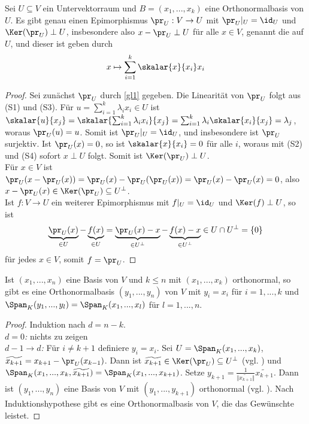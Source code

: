 \begin{proposition}
	Sei $U\subseteq V$ ein Untervektorraum und $B=(x_1,...,x_k)$ eine Orthonormalbasis von $U$. Es gibt genau einen Epimorphismus $\pr_U:V\to U$ mit $\pr_U\vert_U=\id_U$ und $\Ker(\pr_U)\perp U$, insbesondere also $x-\pr_U\perp U$ für alle $x\in V$, genannt die  auf $U$, und dieser ist geben durch
	\begin{align}
		\label{gl1}
		x\mapsto\sum_{i=1}^k \skalar{x}{x_i}x_i
	\end{align}
\end{proposition}
\begin{proof}
	Sei zunächst $\pr_U$ durch \cref{gl1} gegeben. Die Linearität von $\pr_U$ folgt aus (S1) und (S3). Für $u=\sum_{i=1}^k \lambda_i x_i\in U$ ist $\skalar{u}{x_j}=\skalar{\sum_{i=1}^k \lambda_i x_i}{x_j}=\sum_{i=1}^k \lambda_i\skalar{x_i}{x_j}=\lambda_j$, woraus $\pr_U(u)=u$. Somit ist $\pr_U\vert_U=\id_U$, und insbesondere ist $\pr_U$ surjektiv. Ist $\pr_U(x)=0$, so ist $\skalar{x}{x_i}=0$ für alle $i$, woraus mit (S2) und (S4) sofort $x\perp U$ folgt. Somit ist $\Ker(\pr_U)\perp U$. \\
	Für $x\in V$ ist $\pr_U(x-\pr_U(x))=\pr_U(x)-\pr_U(\pr_U(x))=\pr_U(x)-\pr_U(x)=0$, also $x-\pr_U(x)\in\Ker(\pr_U)\subseteq U^\perp$. \\
	Ist $f:V\to U$ ein weiterer Epimorphismus mit $f\vert_U=\id_U$ und $\Ker(f)\perp U$, so ist 
	\begin{align}
		\underbrace{\pr_U(x)}_{\in U}-\underbrace{f(x)}_{\in U}=\underbrace{\pr_U(x)-x}_{\in U^\perp}-\underbrace{f(x)-x}_{\in U^\perp}\in U\cap U^\perp =\{0\}\notag
	\end{align}
	für jedes $x\in V$, somit $f=\pr_U$.
\end{proof}

\begin{theorem}
	Ist $(x_1,...,x_n)$ eine Basis von $V$ und $k\le n$ mit $(x_1,...,x_k)$ orthonormal, so gibt es eine Orthonormalbasis $(y_1,...,y_n)$ von $V$ mit $y_i=x_i$ für $i=1,...,k$ und $\Span_K(y_1,...,y_l)=\Span_K(x_1,...,x_l)$ für $l=1,...,n$.
\end{theorem}
\begin{proof}
	Induktion nach $d=n-k$. \\
	\emph{$d=0$:} nichts zu zeigen \\
	\emph{$d-1\to d$:} Für $i\neq k+1$ definiere $y_i=x_i$. Sei $U=\Span_K(x_1,...,x_k)$, $\widetilde{x_{k+1}}=x_{k+1}-\pr_U(x_{k-1})$. Dann ist $\widetilde{x_{k+1}}\in\Ker(\pr_U)\subseteq U^\perp$ (vgl. ) und $\Span_K(x_1,...,x_k,\widetilde{x_{k+1}})=\Span_K(x_1,...,x_{k+1})$. Setze $y_{k+1}=\frac{1}{\Vert \widetilde{x_{k+1}}\Vert}\widetilde{x_{k+1}}$. Dann ist $(y_1,...,y_n)$ eine Basis von $V$ mit $(y_1,...,y_{k+1})$ orthonormal (vgl. ). Nach Induktionshypothese gibt es eine Orthonormalbasis von $V$, die das Gewünschte leistet.
\end{proof}

